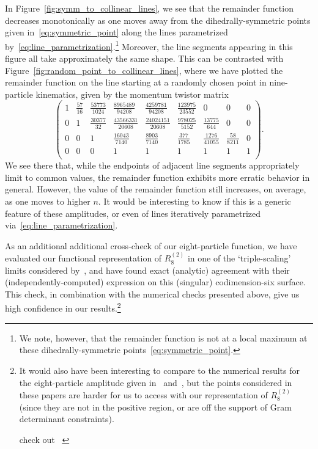 \documentclass[11pt]{article}
\begin{document}
In Figure~\ref{fig:symm_to_collinear_lines}, we see that the remainder function decreases monotonically as one moves away from the dihedrally-symmetric points given in~\eqref{eq:symmetric_point} along the lines parametrized by~\eqref{eq:line_parametrization}.\footnote{We note, however, that the remainder function is not at a local maximum at these dihedrally-symmetric points~\eqref{eq:symmetric_point}.} Moreover, the line segments appearing in this figure all take approximately the same shape. This can be contrasted with Figure~\ref{fig:random_point_to_collinear_lines}, where we have plotted the remainder function on the line starting at a randomly chosen point in nine-particle kinematics, given by the momentum twistor matrix
\begin{equation} \label{eq:random_kinematic_point}
\left(
\begin{array}{ccccccccc}
 1 & \frac{57}{16} & \frac{53773}{1024} & \frac{8965489}{94208} & \frac{4259781}{94208} & \frac{123975}{23552} & 0 & 0 & 0 \\
 0 & 1 & \frac{30377}{32} & \frac{43566331}{20608} & \frac{24024151}{20608} & \frac{978025}{5152} & \frac{13775}{644} & 0 & 0 \\
 0 & 0 & 1 & \frac{16043}{7140} & \frac{8903}{7140} & \frac{377}{1785} & \frac{1276}{41055} & \frac{58}{8211} & 0 \\
 0 & 0 & 0 & 1 & 1 & 1 & 1 & 1 & 1 \\
\end{array}
\right).
\end{equation}
We see there that, while the endpoints of adjacent line segments appropriately limit to common values, the remainder function exhibits more erratic behavior in general. However, the value of the remainder function still increases, on average, as one moves to higher $n$. It would be interesting to know if this is a generic feature of these amplitudes, or even of lines iteratively parametrized via~\eqref{eq:line_parametrization}.

As an additional additional cross-check of our eight-particle function, we have evaluated our functional representation of $R_8^{(2)}$\! in one of the `triple-scaling' limits considered by~\cite{Lance_correspondance}, and have found exact (analytic) agreement with their (independently-computed) expression on this (singular) codimension-six surface. This check, in combination with the numerical checks presented above, give us high confidence in our results.\footnote{It would also have been interesting to compare to the numerical results for the eight-particle amplitude given in~\cite{Anastasiou:2009kna,Brandhuber:2009da} and~\cite{Alday:2009yn,Alday:2009ga}, but the points considered in these papers are harder for us to access with our representation of $R_8^{(2)}$ (since they are not in the positive region, or are off the support of Gram determinant constraints). 

check out ~\cite{DelDuca:2010zp,Heslop:2010kq,Gaiotto:2010fk}}
\end{document}
